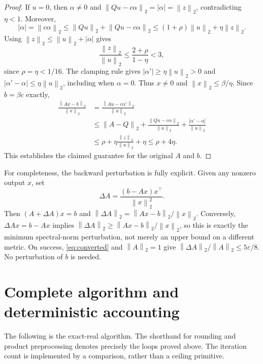 \documentclass[11pt,a4paper]{article}
\theoremstyle{remark}
\newcommand{\eps}{\varepsilon}
\newcommand{\norm}[1]{\left\|#1\right\|_2}
\begin{document}
\begin{proof}
If $u=0$, then $\alpha\ne0$ and
$\norm{Qu-c\alpha}=|\alpha|=\norm{z}$, contradicting $\eta<1$.
Moreover,
\[
 |\alpha|=\norm{c\alpha}
 \le\norm{Qu}+\norm{Qu-c\alpha}
 \le(1+\rho)\norm{u}+\eta\norm{z}.
\]
Using $\norm{z}\le\norm{u}+|\alpha|$ gives
\begin{equation}\label{eq:projectiveratio}
 \frac{\norm{z}}{\norm{u}}
 \le\frac{2+\rho}{1-\eta}<3,
\end{equation}
since $\rho=\eta<1/16$. The clamping rule gives
$|\alpha'|\ge\eta\norm{u}>0$ and
$|\alpha'-\alpha|\le\eta\norm{u}$, including when $\alpha=0$.
Thus $x\ne0$ and $\norm{x}\le\beta/\eta$. Since $b=\beta c$ exactly,
\begin{align*}
 \frac{\norm{Ax-b}}{\norm{x}}
 &=\frac{\norm{Au-c\alpha'}}{\norm{u}}\\
 &\le\norm{A-Q}
   +\frac{\norm{Qu-c\alpha}}{\norm{u}}
   +\frac{|\alpha'-\alpha|}{\norm{u}}\\
 &\le\rho+\eta\frac{\norm{z}}{\norm{u}}+\eta
 \le\rho+4\eta.
\end{align*}
This establishes the claimed guarantee for the original $A$ and $b$.
\end{proof}

For completeness, the backward perturbation is fully explicit. Given any
nonzero output $x$, set
\begin{equation}\label{eq:rankone}
 \Delta A=\frac{(b-Ax)x^\top}{\norm{x}^2}.
\end{equation}
Then $(A+\Delta A)x=b$ and
$\norm{\Delta A}=\norm{Ax-b}/\norm{x}$. Conversely,
$\Delta A x=b-Ax$ implies
$\norm{\Delta A}\ge\norm{Ax-b}/\norm{x}$, so this is exactly the minimum
spectral-norm perturbation, not merely an upper bound on a different metric.
On success, \eqref{eq:converted} and $\norm{A}=1$ give
$\norm{\Delta A}/\norm{A}\le5\eps/8$. No perturbation of $b$ is needed.

\clearpage
\section{Complete algorithm and deterministic accounting}

The following is the exact-real algorithm. The shorthand for rounding and
product preprocessing denotes precisely the loops proved above.
The iteration count is implemented by a comparison, rather than a ceiling
primitive.
\end{document}
